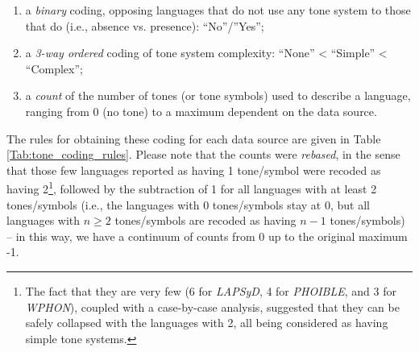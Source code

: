 \documentclass[twoside,onecolumn]{article}
\begin{document}
\begin{enumerate}
  \item a \emph{binary} coding, opposing languages that do not use any tone system to those that do (i.e., absence vs. presence): ``No''/''Yes'';
  \item a \emph{3-way ordered} coding of tone system complexity: ``None'' < ``Simple'' < ``Complex'';
  \item a \emph{count} of the number of tones (or tone symbols) used to describe a language, ranging from 0 (no tone) to a maximum dependent on the data source.
\end{enumerate}

The rules for obtaining these coding for each data source are given in Table \ref{Tab:tone_coding_rules}.
Please note that the counts were \emph{rebased}, in the sense that those few languages reported as having 1 tone/symbol were recoded as having 2\footnote{The fact that they are very few (6 for \textit{LAPSyD}, 4 for \textit{PHOIBLE}, and 3 for \textit{WPHON}), coupled with a case-by-case analysis, suggested that they can be safely collapsed with the languages with 2, all being considered as having simple tone systems.}, followed by the subtraction of 1 for all languages with at least 2 tones/symbols (i.e., the languages with 0 tones/symbols stay at 0, but all languages with $n \geq 2$ tones/symbols are recoded as having $n-1$ tones/symbols) -- in this way, we have a continuum of counts from 0 up to the original maximum -1.
\end{document}
